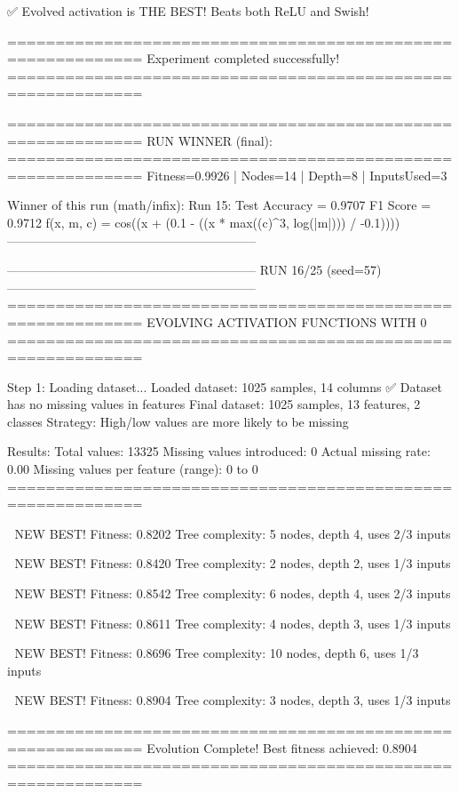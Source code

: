 ✅ Evolved activation is THE BEST! Beats both ReLU and Swish!

============================================================
Experiment completed successfully!
============================================================

============================================================
RUN WINNER (final):
============================================================
Fitness=0.9926 | Nodes=14 | Depth=8 | InputsUsed=3

Winner of this run (math/infix):
  Run 15:
     Test Accuracy = 0.9707
     F1 Score      = 0.9712
     f(x, m, c)    = cos((x + (0.1 - ((x * max((c)^3, log(|m|))) / -0.1))))
------------------------------------------------------------

------------------------------------------------------------
RUN 16/25 (seed=57)
------------------------------------------------------------
============================================================
EVOLVING ACTIVATION FUNCTIONS
WITH 0%
============================================================

Step 1: Loading dataset...
Loaded dataset: 1025 samples, 14 columns
✅ Dataset has no missing values in features
Final dataset: 1025 samples, 13 features, 2 classes
Strategy: High/low values are more likely to be missing

Results:
  Total values: 13325
  Missing values introduced: 0
  Actual missing rate: 0.00%
  Missing values per feature (range): 0 to 0
============================================================


🎯 NEW BEST! Fitness: 0.8202
Tree complexity: 5 nodes, depth 4, uses 2/3 inputs

🎯 NEW BEST! Fitness: 0.8420
Tree complexity: 2 nodes, depth 2, uses 1/3 inputs

🎯 NEW BEST! Fitness: 0.8542
Tree complexity: 6 nodes, depth 4, uses 2/3 inputs

🎯 NEW BEST! Fitness: 0.8611
Tree complexity: 4 nodes, depth 3, uses 1/3 inputs

🎯 NEW BEST! Fitness: 0.8696
Tree complexity: 10 nodes, depth 6, uses 1/3 inputs

🎯 NEW BEST! Fitness: 0.8904
Tree complexity: 3 nodes, depth 3, uses 1/3 inputs

============================================================
Evolution Complete!
Best fitness achieved: 0.8904
============================================================

